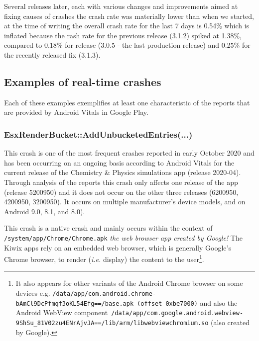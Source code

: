 Several releases later, each with various changes and improvements aimed at fixing causes of crashes the crash rate was materially lower than when we started, at the time of writing the overall crash rate for the last 7 days is 0.54\% which is inflated because the rash rate for the previous release (3.1.2) spiked at 1.38\%, compared to 0.18\% for release (3.0.5 -  the last production release) and 0.25\% for the recently released fix (3.1.3).

\subsection{Examples of real-time crashes}
Each of these examples exemplifies at least one characteristic of the reports that are provided by Android Vitals in Google Play.

\subsubsection{EsxRenderBucket::AddUnbucketedEntries(...)}
This crash is one of the most frequent crashes reported in early October 2020 and has been occurring on an ongoing basis according to Android Vitals for the current release of the Chemistry \& Physics simulations app (release 2020-04). Through analysis of the reports this crash only affects one release of the app (release 5200950) and it does not occur on the other three releases (6200950, 4200950, 3200950). It occurs on multiple manufacturer's device models, and on Android 9.0, 8.1, and 8.0). 

This crash is a native crash and mainly occurs within the context of \texttt{/system/app/Chrome/Chrome.apk} \textit{the web browser app created by Google!} The Kiwix apps rely on an embedded web browser, which is generally Google's Chrome browser, to render (\emph{i.e.} display) the content to the user\footnote{It also appears for other variants of the Android Chrome browser on some devices e.g. \texttt{/data/app/com.android.chrome-bAmCl9DcPfmqf3oKL54Efg==/base.apk (offset 0xbe7000)} and also the Android WebView component~\texttt{/data/app/com.google.android.webview-9ShSu\_81V02zu4ENrAjvJA==/lib/arm/libwebviewchromium.so} (also created by Google).}.

